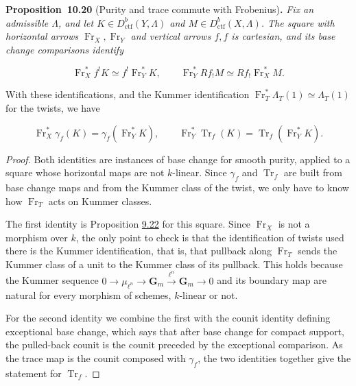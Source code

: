 \documentclass[11pt]{article}
\newenvironment{bpstatement}[2]{\par\addvspace{0.6\baselineskip}\noindent\textbf{#1}#2\textbf{.}\enspace\ignorespaces}
  {\par\addvspace{0.4\baselineskip}}
\newenvironment{bpstatementit}[2]{\begin{bpstatement}{#1}{#2}\itshape\ignorespaces}{\end{bpstatement}}
\begin{document}
\label{bp162}%
\begin{bpstatementit}{Proposition~10.20}{ (Purity and trace commute with Frobenius)}
Fix an admissible \(\Lambda\), and let \(K\in D^b_{\mathrm{ctf}}(Y,\Lambda)\) and \(M\in D^b_{\mathrm{ctf}}(X,\Lambda)\). The square with horizontal arrows \(\operatorname{Fr}_X,\operatorname{Fr}_Y\) and vertical arrows \(f,f\) is cartesian, and its base change comparisons identify

\[
\operatorname{Fr}_X^*f^!K
\simeq f^!\operatorname{Fr}_Y^*K,
\qquad
\operatorname{Fr}_Y^*Rf_!M
\simeq Rf_!\operatorname{Fr}_X^*M.
\tag{10.9}
\]

With these identifications, and the Kummer identification \(\operatorname{Fr}_T^*\Lambda_T(1)\simeq\Lambda_T(1)\) for the twists, we have

\[
\operatorname{Fr}_X^*\gamma_f(K)
=\gamma_f(\operatorname{Fr}_Y^*K),
\qquad
\operatorname{Fr}_Y^*\operatorname{Tr}_f(K)
=\operatorname{Tr}_f(\operatorname{Fr}_Y^*K).
\]
\end{bpstatementit}

\begin{proof}[{Proof}]\label{bp163}%
Both identities are instances of base change for smooth purity, applied to a square whose horizontal maps are not \(k\)-linear. Since \(\gamma_f\) and \(\operatorname{Tr}_f\) are built from base change maps and from the Kummer class of the twist, we only have to know how \(\operatorname{Fr}_T\) acts on Kummer classes.

The first identity is Proposition \hyperref[bp78]{9.22} for this square. Since \(\operatorname{Fr}_X\) is not a morphism over \(k\), the only point to check is that the identification of twists used there is the Kummer identification, that is, that pullback along \(\operatorname{Fr}_T\) sends the Kummer class of a unit to the Kummer class of its pullback. This holds because the Kummer sequence \(0\to\mu_{\ell^n}\to\mathbf G_m\xrightarrow{\ell^n}\mathbf G_m\to0\) and its boundary map are natural for every morphism of schemes, \(k\)-linear or not.

For the second identity we combine the first with the counit identity defining exceptional base change, which says that after base change for compact support, the pulled-back counit is the counit preceded by the exceptional comparison. As the trace map is the counit composed with \(\gamma_f\), the two identities together give the statement for \(\operatorname{Tr}_f\).
\end{proof}
\end{document}
